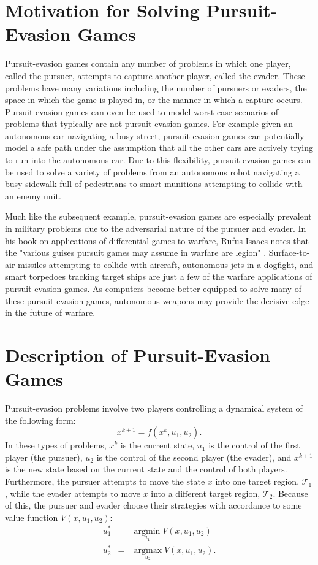 \section{Motivation for Solving Pursuit-Evasion Games}
Pursuit-evasion games contain any number of problems in which one player, called the pursuer, attempts to capture another player, called the evader. These problems have many variations including the number of pursuers or evaders, the space in which the game is played in, or the manner in which a capture occurs. Pursuit-evasion games can even be used to model worst case scenarios of problems that typically are not pursuit-evasion games. For example given an autonomous car navigating a busy street, pursuit-evasion games can potentially model a safe path under the assumption that all the other cars are actively trying to run into the autonomous car. Due to this flexibility, pursuit-evasion games can be used to solve a variety of problems from an autonomous robot navigating a busy sidewalk full of pedestrians to smart munitions attempting to collide with an enemy unit.

Much like the subsequent example, pursuit-evasion games are especially prevalent in military problems due to the adversarial nature of the pursuer and evader. In his book on applications of differential games to warfare, Rufus Isaacs notes that the "various guises pursuit games may assume in warfare are legion" \cite{isaacs}. Surface-to-air missiles attempting to collide with aircraft, autonomous jets in a dogfight, and smart torpedoes tracking target ships are just a few of the warfare applications of pursuit-evasion games. As computers become better equipped to solve many of these pursuit-evasion games, autonomous weapons may provide the decisive edge in the future of warfare.  
        
\section{Description of Pursuit-Evasion Games}\label{pegames}
Pursuit-evasion problems involve two players controlling a dynamical system of the following form: 
\begin{equation}
x^{k+1}=f(x^k, u_1, u_2).
\end{equation}
In these types of problems, $x^k$ is the current state, $u_1$ is the control of the first player (the pursuer), $u_2$ is the control of the second player (the evader), and $x^{k+1}$ is the new state based on the current state and the control of both players. Furthermore, the pursuer attempts to move the state $x$ into one target region, $\mathscr{T}_1$, while the evader attempts to move $x$ into a different target region, $\mathscr{T}_2$. Because of this, the pursuer and evader choose their strategies with accordance to some value function $V(x,u_1,u_2)$: 
\begin{eqnarray}\label{gameqn}
u_1^* & = & \underset{u_1}{\operatorname{argmin}}V(x,u_1,u_2)\\
u_2^* & = & \underset{u_2}{\operatorname{argmax}}V(x,u_1,u_2).
\end{eqnarray}


